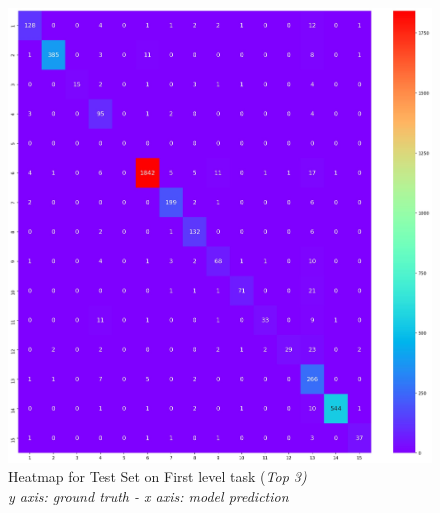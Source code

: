\documentclass[12pt]{article}
\begin{document}
\begin{figure}[ht!]
        \begin{adjustwidth}{-3.2cm}{}
    	    \begin{center}
        \includegraphics[width=1.45\textwidth]{heat_first3.jpg}
            \end{center}
	    \end{adjustwidth}
	    \captionsetup{justification   = centering}
        \caption{Heatmap for Test Set on First level task (\textit{Top 3) \\y axis: \textit{ground truth} - x axis: \textit{model prediction}}}
        \label{fig:heatfirst3}
\end{figure}
\end{document}
